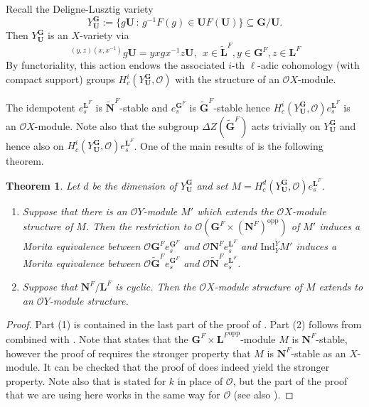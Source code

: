 \documentclass{amsart}
\theoremstyle{plain}\newtheorem{Theorem}{Theorem}[section]
\theoremstyle{plain}\newtheorem{Conjecture}[Theorem]{Conjecture}
\theoremstyle{plain}\newtheorem{Corollary}[Theorem]{Corollary}
\theoremstyle{plain}\newtheorem{Lemma}[Theorem]{Lemma}
\theoremstyle{plain}\newtheorem{Proposition}[Theorem]{Proposition}
\theoremstyle{definition}\newtheorem{Definition}[Theorem]{Definition}
\theoremstyle{definition}\newtheorem{Example}[Theorem]{Example}
\theoremstyle{definition}\newtheorem{Examples}[Theorem]{Examples}
\theoremstyle{definition}\newtheorem{Exercise}[Theorem]{Exercise}
\theoremstyle{definition}\newtheorem{Notation}[Theorem]{Notation}
\theoremstyle{definition}\newtheorem{Remark}[Theorem]{Remark}
\theoremstyle{definition}\newtheorem{Remarks}[Theorem]{Remarks}
\def\CO{{\mathcal{O}}}    \def\OPE{{\mathcal{O}(P\rtimes E)}}
\def\Ind{\mathrm{Ind}}    \def\tenC{\otimes_C}
\def\opp{\mathrm{opp}}
\newcommand{\bG}{{\mathbf{G}}}
\newcommand{\bL}{{\mathbf{L}}}
\newcommand{\bN}{{\mathbf{N}}}
\newcommand{\bU}{{\mathbf{U}}}
\numberwithin{equation}{section}
\begin{document}
Recall  the  Deligne-Lusztig variety  $$ Y_{\bU}^{\bG}  :=\{ g \bU \, : \,  g^{-1} F(g) \in \bU  F(\bU) \} \subseteq \bG/\bU.$$ 
Then    $Y_{\bU}^{\bG} $  is an  $X$-variety  via  $$ \,^{(y, z) (x, x^{-1})}  g \bU   =  y xg x^{-1}z \bU,    \  \ x\in \tilde \bL^F,   y \in \bG^F, z \in \bL^F $$ By functoriality, this action endows   the  associated  $i$-th  $\ell$-adic cohomology (with compact support)   groups   $H_c^i( Y_{\bU}^{\bG}, \CO)$    with the structure  of an $\CO X$-module.   


The idempotent $e_s^{\bL^F}$ is $\tilde \bN^F$-stable and  $e_s^{\bG^F}$ is $\tilde \bG^F$-stable  hence $H_c^i( Y_{\bU}^{\bG}, \CO) e_s^{\bL^F}$  is an  $\CO  X$-module.  Note also that  the subgroup  $\Delta Z(\tilde \bG^F) $   acts  trivially  on $ Y_{\bU}^{\bG} $  and hence   also  on  $H_c^i( Y_{\bU}^{\bG}, \CO) e_s^{\bL^F}$. One of the main results of  \cite{BDR}  is the following theorem. 


\begin{Theorem} \label{thm-BDR}  Let $d$ be  the dimension of   $Y_{\bU}^{\bG}$  and set  $M=  H_c^d (Y_{\bU}^{\bG}, \CO) e_s^{\bL^F}$.
\begin{enumerate} 
\item  Suppose that   there is  an   $\CO Y$-module   $M'$  which extends  the $\CO X$-module structure of  $M$. Then the restriction to $\CO (\bG^F \times  (\bN^F)^{\opp}) $  of  $M'$ induces  a Morita equivalence between $\CO \bG^F e_s^{\bG^F} $ and   $\CO \bN^F e_s^{\bL^F} $  and $\Ind_Y ^{\tilde Y} M' $ induces a Morita equivalence between  $\CO \tilde \bG^F e_s^{\bG^F} $ and   $\CO\tilde \bN^F e_s^{\bL^F} $.
\item  Suppose that  $\bN^F/ \bL^F $ is cyclic. Then the   $\CO X $-module  structure of   $M$  extends to  an  $\CO Y$-module structure.    
\end{enumerate}
\end{Theorem}

\begin{proof}  Part (1)  is  contained in the last part of the proof of  \cite[Thm.~7.5]{BDR}.  Part (2) follows from  \cite[Thm.~7.2]{BDR}  combined with \cite[Lem.~10.2.13]{Rou98}. Note that \cite[Thm.~7.2]{BDR} states that the  $\bG^F \times {\bL^F}^{\opp}$-module  $M$ is  $\bN^F$-stable, however the proof of \cite[Thm.~7.5]{BDR} requires  the stronger property  that  $M$ is  $\bN^F$-stable  as an $ X$-module. It can be checked  that  the proof of \cite[Thm.~7.2]{BDR} does indeed yield the stronger property. Note also  that \cite[Thm.~7.5]{BDR} is  stated for  $k$  in place of $\CO$, but the part of the proof  that we are using here works  in the same way  for $\CO$  (see also \cite[Thm.~1.1]{Ruh22}).
\end{proof}
\end{document}

